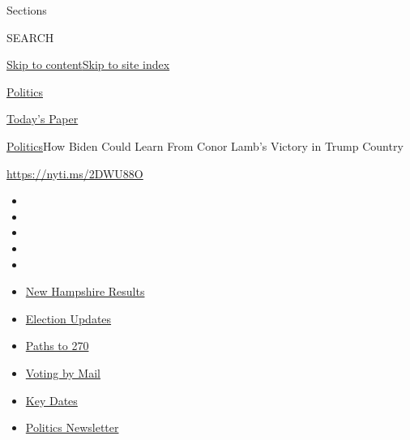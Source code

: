 Sections

SEARCH

\protect\hyperlink{site-content}{Skip to
content}\protect\hyperlink{site-index}{Skip to site index}

\href{https://www.nytimes3xbfgragh.onion/section/politics}{Politics}

\href{https://myaccount.nytimes3xbfgragh.onion/auth/login?response_type=cookie\&client_id=vi}{}

\href{https://www.nytimes3xbfgragh.onion/section/todayspaper}{Today's
Paper}

\href{/section/politics}{Politics}\textbar{}How Biden Could Learn From
Conor Lamb's Victory in Trump Country

\url{https://nyti.ms/2DWU88O}

\begin{itemize}
\item
\item
\item
\item
\item
\end{itemize}

\begin{itemize}
\item
  \href{https://www.nytimes3xbfgragh.onion/interactive/2020/09/08/us/elections/results-new-hampshire-primary-elections.html?action=click\&pgtype=Article\&state=default\&region=TOP_BANNER\&context=storylines_menu}{New
  Hampshire Results}
\item
  \href{https://www.nytimes3xbfgragh.onion/live/2020/09/09/us/trump-vs-biden?action=click\&pgtype=Article\&state=default\&region=TOP_BANNER\&context=storylines_menu}{Election
  Updates}
\item
  \href{https://www.nytimes3xbfgragh.onion/interactive/2020/us/elections/election-states-biden-trump.html?action=click\&pgtype=Article\&state=default\&region=TOP_BANNER\&context=storylines_menu}{Paths
  to 270}
\item
  \href{https://www.nytimes3xbfgragh.onion/interactive/2020/08/31/us/politics/vote-by-mail-deadlines.html?action=click\&pgtype=Article\&state=default\&region=TOP_BANNER\&context=storylines_menu}{Voting
  by Mail}
\item
  \href{https://www.nytimes3xbfgragh.onion/interactive/2019/us/elections/2020-presidential-election-calendar.html?action=click\&pgtype=Article\&state=default\&region=TOP_BANNER\&context=storylines_menu}{Key
  Dates}
\item
  \href{https://www.nytimes3xbfgragh.onion/newsletters/politics?action=click\&pgtype=Article\&state=default\&region=TOP_BANNER\&context=storylines_menu}{Politics
  Newsletter}
\end{itemize}

